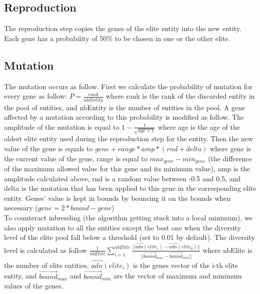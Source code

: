 \subsection{Reproduction}

The reproduction step copies the genes of the elite entity into the new entity. Each gene has a probability of 50\% to be chosen in one or the other elite.\\

\subsection{Mutation}

The mutation occurs as follow. First we calculate the probability of mutation for every gene as follow: $P=\frac{rank}{nbEntity}$ where rank is the rank of the discarded entity in the pool of entities, and nbEntity is the number of entities in the pool. A gene affected by a mutation according to this probability is modified as follow. The amplitude of the mutation is equal to $1-\frac{1}{\sqrt{age+1}}$ where age is the age of the oldest elite entity used during the reproduction step for the entity. Then the new value of the gene is equals to $gene+range*amp*(rnd+delta)$ where gene is the current value of the gene, range is equal to $max_{gene}-min_{gene}$ (the difference of the maximum allowed value for this gene and its minimum value), amp is the amplitude calculated above, rnd is a random value between -0.5 and 0.5, and delta is the mutation that has been applied to this gene in the corresponding elite entity. Genes' value is kept in bounds by bouncing it on the bounds when necessary ($gene=2*bound-gene$)\\

To counteract inbreeding (the algorithm getting stuck into a local minimum), we also apply mutation to all the entities except the best one when the diversity level of the elite pool fall below a threshold (set to 0.01 by default). The diversity level is calculated as follow $\frac{1}{nbElite}\sum_{i=1}^{nbElite}\frac{||\overrightarrow{adn}(elite_i)-\overrightarrow{adn}(elite_0)||}{||\overrightarrow{bound}_{max}-\overrightarrow{bound}_{min}||}$ where nbElite is the number of elite entities, $\overrightarrow{adn}(elite_i)$ is the genes vector of the i-th elite entity, and $\overrightarrow{bound}_{max}$ and $\overrightarrow{bound}_{min}$ are the vector of maximum and minimum values of the genes.\\ 

